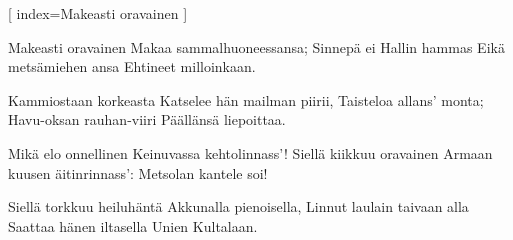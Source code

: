 [%
index={Makeasti oravainen}
]

\beginverse
Makeasti oravainen
Makaa sammalhuoneessansa;
Sinnepä ei Hallin hammas
Eikä metsämiehen ansa
Ehtineet milloinkaan.
\endverse

\beginverse
Kammiostaan korkeasta
Katselee hän mailman piirii,
Taisteloa allans' monta;
Havu-oksan rauhan-viiri
Päällänsä liepoittaa.
\endverse

\beginverse
Mikä elo onnellinen
Keinuvassa kehtolinnass'!
Siellä kiikkuu oravainen
Armaan kuusen äitinrinnass':
Metsolan kantele soi!
\endverse

\beginverse
Siellä torkkuu heiluhäntä
Akkunalla pienoisella,
Linnut laulain taivaan alla
Saattaa hänen iltasella
Unien Kultalaan.
\endverse

\endsong